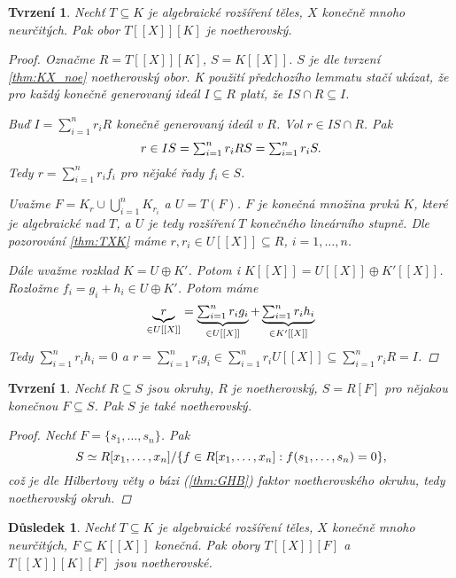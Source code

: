 \documentclass[11pt,a4paper]{article}
\newcommand*{\ml}[1]{\[\textstyle\let\displaystyle\textstyle#1\]}	%
\newcounter{numb}
\theoremstyle{definition}
\theoremstyle{plain}
\newtheorem{tvrzeni}[numb]{Tvrzení}
\newtheorem{dusledek}[numb]{Důsledek}
\begin{document}
\begin{tvrzeni}
	Nechť $T \subseteq K$ je algebraické rozšíření těles, $X$ konečně mnoho neurčitých. Pak obor $T[[X]][K]$ je noetherovský.

	\begin{proof}
		\newcommand*\I{_{i = 1}^n}

		Označme $R = T[[X]][K]$, $S = K[[X]]$. $S$ je dle tvrzení \ref{thm:KX_noe} noetherovský obor. K použití předchozího lemmatu stačí ukázat, že pro každý konečně generovaný ideál $I \subseteq R$ platí, že $IS \cap R \subseteq I$.

		Buď $I = \sum\I r_i R$ konečně generovaný ideál v $R$. Vol $r \in IS \cap R$. Pak
		\ml{
			r \in IS = \sum\I r_i RS = \sum\I r_i S.
		}
		Tedy $r = \sum\I r_i f_i$ pro nějaké řady $f_i \in S$.

		Uvažme $F = K_r \cup \bigcup\I K_{r_i}$ a $U = T(F)$. $F$ je konečná množina prvků $K$, které je algebraické nad $T$, a $U$ je tedy rozšíření $T$ konečného lineárního stupně. Dle pozorování \ref{thm:TXK} máme $r, r_i \in U[[X]] \subseteq R$, $i = 1, \hdots, n$.

		Dále uvažme rozklad $K = U \oplus K'$. Potom i $K[[X]] = U[[X]] \oplus K'[[X]]$. Rozložme $f_i = g_i + h_i \in U \oplus K'$. Potom máme
		\ml{
			\underbrace{r}_{\in U[[X]]} = \underbrace{\sum\I r_i g_i}_{\in U[[X]]} + \underbrace{\sum\I r_i h_i}_{\in K'[[X]]}
		}
		Tedy $\sum\I r_i h_i = 0$ a $r = \sum\I r_i g_i \in \sum\I r_i U[[X]] \subseteq \sum\I r_i R = I$.
	\end{proof}
\end{tvrzeni}

\begin{tvrzeni} \label{thm:RF_noe}
	Nechť $R \subseteq S$ jsou okruhy, $R$ je noetherovský, $S = R[F]$ pro nějakou konečnou $F \subseteq S$. Pak $S$ je také noetherovský.

	\begin{proof}
		Nechť $F = \{s_1, \hdots, s_n\}$. Pak
		\ml{
			S \simeq R[x_1, \hdots, x_n] / \{f \in R[x_1, \hdots, x_n]: f(s_1, \hdots, s_n) = 0\},
		}
		což je dle Hilbertovy věty o bázi (\ref{thm:GHB}) faktor noetherovského okruhu, tedy noetherovský okruh.
	\end{proof}
\end{tvrzeni}

\begin{dusledek} \label{thm:noe}
	Nechť $T \subseteq K$ je algebraické rozšíření těles, $X$ konečně mnoho neurčitých, $F \subseteq K[[X]]$ konečná. Pak obory $T[[X]][F]$ a $T[[X]][K][F]$ jsou noetherovské.
\end{dusledek}
\end{document}
